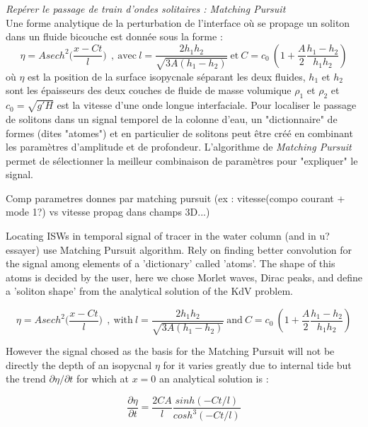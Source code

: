 \noindent\textit{Repérer le passage de train d'ondes solitaires : Matching Pursuit}\\
Une forme analytique de la perturbation de l'interface où se propage un soliton dans un fluide bicouche est donnée sous la forme : 
\begin{equation}
\eta = A sech^2\bigg( \frac{x-Ct}{l} \bigg) \ \ , \ \text{avec} \ l = \frac{2h_1h_2}{\sqrt{3A(h_1-h_2)}} \ \text{et} \ C=c_0 \ (1 + \frac{A}{2} \frac{h_1-h_2}{h_1h_2})
\end{equation}
où $\eta$ est la position de la surface isopycnale séparant les deux fluides, $h_1$ et $h_2$ sont les épaisseurs des deux couches de fluide de masse volumique $\rho_1$ et $\rho_2$ et $c_0=\sqrt{g'H}$ est la vitesse d'une onde longue interfaciale.
Pour localiser le passage de solitons dans un signal temporel de la colonne d'eau, un "dictionnaire" de formes (dites "atomes") et en particulier de solitons peut être créé en combinant les paramètres d'amplitude et de profondeur. L'algorithme de \textit{Matching Pursuit} \citep{mallat_1993} permet de sélectionner la meilleur combinaison de paramètres pour "expliquer" le signal.\color{black}


Comp parametres donnes par matching pursuit (ex : vitesse(compo courant + mode 1?) vs vitesse propag dans champs 3D...)

Locating ISWs in temporal signal of tracer in the water column (and in u? essayer) use Matching Pursuit algorithm. Rely on finding better convolution for the signal among elements of a 'dictionary' called 'atoms'. The shape of this atoms is decided by the user, here we chose Morlet waves, Dirac peaks, and define a 'soliton shape' from the analytical solution of the KdV problem.

\begin{equation}
\eta = A sech^2\bigg( \frac{x-Ct}{l} \bigg) \ \ , \ \text{with} \ l = \frac{2h_1h_2}{\sqrt{3A(h_1-h_2)}} \ \text{and} \ C=c_0 \ (1 + \frac{A}{2} \frac{h_1-h_2}{h_1h_2})
\end{equation}

However the signal chosed as the basis for the Matching Pursuit will not be directly the depth of an isopycnal $\eta$ for it varies greatly due to internal tide but the trend $\partial \eta/\partial t$ for which at $x=0$ an analytical solution is :

\begin{equation}
\frac{\partial \eta}{\partial t} = \frac{2 C A}{l} \frac{sinh(-Ct/l)}{cosh^3(-Ct/l)}
\end{equation}

